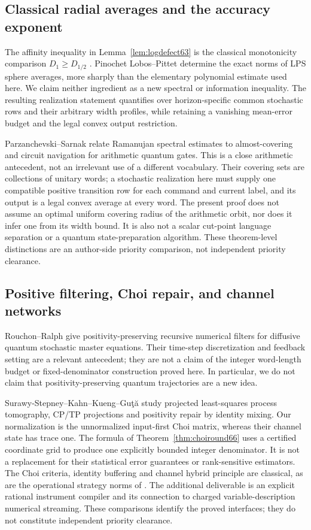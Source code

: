 \subsection{Classical radial averages and the accuracy exponent}
The affinity inequality in Lemma~\ref{lem:logdefect63} is the
classical monotonicity comparison $D_1\ge D_{1/2}$
\cite[Theorem~3]{vEH63}. Pinochet Lobos--Pittet
\cite[Theorem~1.2]{PLP61pre} determine the exact norms of LPS sphere
averages, more sharply than the elementary polynomial estimate used
here. We claim neither ingredient as a new spectral or information
inequality. The resulting realization statement quantifies over
horizon-specific common stochastic rows and their arbitrary width
profiles, while retaining a vanishing mean-error budget and the legal
convex output restriction.

Parzanchevski--Sarnak \cite[Section~3, Proposition~3.1]{PS63} relate
Ramanujan spectral estimates to almost-covering and circuit navigation
for arithmetic quantum gates. This is a close arithmetic antecedent,
not an irrelevant use of a different vocabulary. Their covering sets
are collections of unitary words; a stochastic realization here must
supply one compatible positive transition row for each command and
current label, and its output is a legal convex average at every word.
The present proof does not assume an optimal uniform covering radius
of the arithmetic orbit, nor does it infer one from its width bound.
It is also not a scalar cut-point language separation or a quantum
state-preparation algorithm. These theorem-level distinctions are an
author-side priority comparison, not independent priority clearance.

\subsection{Positive filtering, Choi repair, and channel networks}
Rouchon--Ralph \cite[Section~II, equations~(10)--(13)]{RouchonRalph66}
give positivity-preserving recursive numerical filters for diffusive
quantum stochastic master equations. Their time-step discretization
and feedback setting are a relevant antecedent; they are not a claim
of the integer word-length budget or fixed-denominator construction
proved here. In particular, we do not claim that positivity-preserving
quantum trajectories are a new idea.

Surawy-Stepney--Kahn--Kueng--Gu\c{t}\u{a}
\cite[Sections~4 and~13]{PLS66} study projected least-squares process
tomography, CP/TP projections and positivity repair by identity mixing.
Our normalization is the unnormalized input-first Choi matrix, whereas
their channel state has trace one. The formula of
Theorem~\ref{thm:choiround66} uses a certified coordinate grid to produce
one explicitly bounded integer denominator. It is not a replacement
for their statistical error guarantees or rank-sensitive estimators.
The Choi criteria, identity buffering and channel hybrid principle
are classical, as are the operational strategy norms of
\cite{Gutoski66}. The additional deliverable is an explicit rational
instrument compiler and its connection to charged variable-description
numerical streaming. These comparisons identify the proved interfaces;
they do not constitute independent priority clearance.
